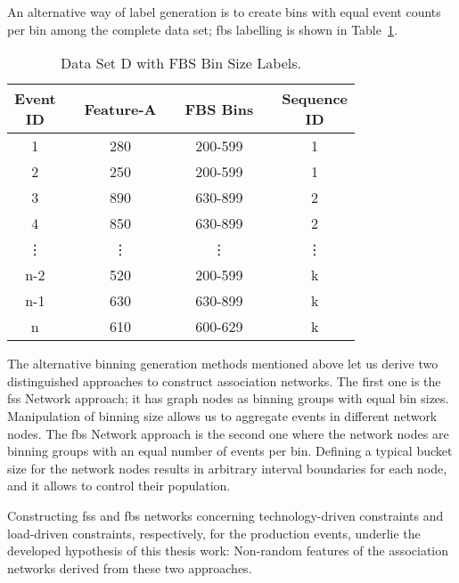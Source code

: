 An alternative way of label generation is to create bins with equal event counts per bin among the complete data set; \ac{fbs} labelling is shown in Table~\ref{Tab: D-dataset-FBS}.
\begin{table}[ht!]
	\centering
	\setlength{\arrayrulewidth}{0.75pt}%
	\caption{Data Set D with FBS Bin Size Labels.}
	\begin{tabular}{|cc|c|ccc|c|}
		\hline \rowcolor[HTML]{FFFFC7}
		\makecell{Event\\ID} 	&& Feature-A    	&& FBS Bins && \makecell{Sequence\\ID} \\ \hline
		1 	      && 280	    && 200-599	&& 1 		     \\
		2 		  && 250	    && 200-599	&& 1 		     \\
		3 	      && 890	    && 630-899	&& 2 		     \\
		4 		  && 850	    && 630-899	&& 2 		     \\
		\vdots	  && \vdots  	&& \vdots	&& \vdots 	     \\
		n-2 	  && 520	    && 200-599	&& k 		     \\
		n-1       && 630	    && 630-899	&& k 		     \\
		n 		  && 610	    && 600-629	&& k 		     \\ \hline
	\end{tabular}
	\label{Tab: D-dataset-FBS}
\end{table}
The alternative binning generation methods mentioned above let us derive two distinguished approaches to construct association networks. The first one is the \acs{fss} Network approach; it has graph nodes as binning groups with equal bin sizes. Manipulation of binning size allows us to aggregate events in different network nodes. The \acs{fbs} Network approach is the second one where the network nodes are binning groups with an equal number of events per bin. Defining a typical bucket size for the network nodes results in arbitrary interval boundaries for each node, and it allows to control their population.


Constructing \acs{fss} and \acs{fbs} networks concerning technology-driven constraints and load-driven constraints, respectively, for the production events, underlie the developed hypothesis of this thesis work: Non-random features of the association networks derived from these two approaches.